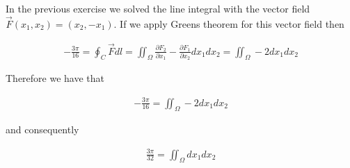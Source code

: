 \documentclass[11pt]{article}
\begin{document}
\begin{solution}
\begin{itemize}
In the previous exercise we solved the line integral with the vector field $\vec F(x_1,x_2) = (x_2,-x_1)$. If we apply Greens theorem for this vector field then

\begin{gather*}
-\frac{3\pi}{16} = \oint_C \vec F dl  =  \iint_{\Omega} \frac{\partial F_2}{\partial x_1} - \frac{\partial F_1}{\partial x_2} dx_1dx_2 = \iint_{\Omega} -2 dx_1dx_2
\end{gather*}

Therefore we have that

\begin{gather*}
-\frac{3\pi}{16} =  \iint_{\Omega} -2 dx_1dx_2
\end{gather*}

and consequently 

\begin{gather*}
\frac{3\pi}{32} =  \iint_{\Omega} dx_1dx_2
\end{gather*}
\end{itemize}
\end{solution}
\end{document}
